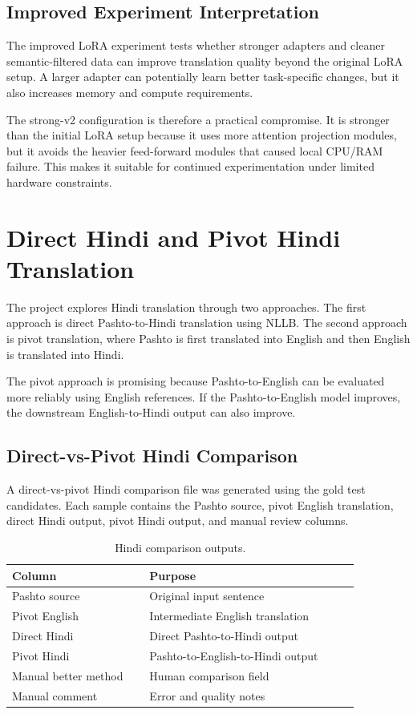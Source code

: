 \documentclass[conference]{IEEEtran}
\begin{document}
\subsection{Improved Experiment Interpretation}

The improved LoRA experiment tests whether stronger adapters and cleaner semantic-filtered data can improve translation quality beyond the original LoRA setup. A larger adapter can potentially learn better task-specific changes, but it also increases memory and compute requirements.

The strong-v2 configuration is therefore a practical compromise. It is stronger than the initial LoRA setup because it uses more attention projection modules, but it avoids the heavier feed-forward modules that caused local CPU/RAM failure. This makes it suitable for continued experimentation under limited hardware constraints.

\section{Direct Hindi and Pivot Hindi Translation}

The project explores Hindi translation through two approaches. The first approach is direct Pashto-to-Hindi translation using NLLB. The second approach is pivot translation, where Pashto is first translated into English and then English is translated into Hindi.

The pivot approach is promising because Pashto-to-English can be evaluated more reliably using English references. If the Pashto-to-English model improves, the downstream English-to-Hindi output can also improve.

\subsection{Direct-vs-Pivot Hindi Comparison}

A direct-vs-pivot Hindi comparison file was generated using the gold test candidates. Each sample contains the Pashto source, pivot English translation, direct Hindi output, pivot Hindi output, and manual review columns.

\begin{table}[H]
\centering
\caption{Hindi comparison outputs.}
\footnotesize
\begin{tabular}{p{0.34\linewidth}p{0.52\linewidth}}
\toprule
\textbf{Column} & \textbf{Purpose} \\
\midrule
Pashto source & Original input sentence \\
Pivot English & Intermediate English translation \\
Direct Hindi & Direct Pashto-to-Hindi output \\
Pivot Hindi & Pashto-to-English-to-Hindi output \\
Manual better method & Human comparison field \\
Manual comment & Error and quality notes \\
\bottomrule
\end{tabular}
\end{table}
\end{document}
